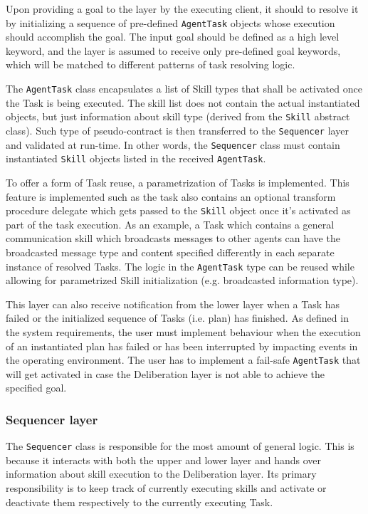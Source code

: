 \documentclass[main.tex]{subfiles}
\begin{document}
Upon providing a goal to the layer by the executing client, it should to resolve it by
initializing a sequence of pre-defined \texttt{AgentTask} objects whose execution should 
accomplish the goal. The input goal should be defined 
as a high level keyword, and the layer is assumed to receive only pre-defined goal keywords,
which will be matched to different patterns of task resolving logic.

The \texttt{AgentTask} class encapsulates a list of Skill types that shall be activated 
once the Task is being executed. The skill list does not contain the actual instantiated 
objects, but just information about skill type (derived from the \texttt{Skill} abstract 
class). Such type of pseudo-contract is then transferred to the \texttt{Sequencer} layer and 
validated at run-time. In other words, the \texttt{Sequencer} class must contain instantiated
\texttt{Skill} objects listed in the received \texttt{AgentTask}.

To offer a form of Task reuse, a parametrization of Tasks is implemented. This feature is 
implemented such as the task also contains an optional transform procedure delegate which 
gets passed to the \texttt{Skill} object once it's activated as part of the task execution.
As an example, a Task which contains a general communication skill which broadcasts messages to
other agents can have the broadcasted message type and content specified differently in each 
separate instance of resolved Tasks. The logic in the \texttt{AgentTask} type can be reused 
while allowing for parametrized Skill initialization (e.g. broadcasted information type). 

This layer can also receive notification from the lower layer when a Task has failed or 
the initialized sequence of Tasks (i.e. plan) has finished. As defined in the system requirements, 
the user must implement behaviour when the execution of an instantiated plan has failed or 
has been interrupted by impacting events in the operating environment. The user has to implement 
a fail-safe \texttt{AgentTask} that will get activated in case the Deliberation layer is not able 
to achieve the specified goal. 

\subsubsection{Sequencer layer}

The \texttt{Sequencer} class is responsible for the most amount of general logic. This is because 
it interacts with both the upper and lower layer and hands over information about skill execution 
to the Deliberation layer. Its primary responsibility is to keep track of currently executing skills 
and activate or deactivate them respectively to the currently executing Task. 
\end{document}
